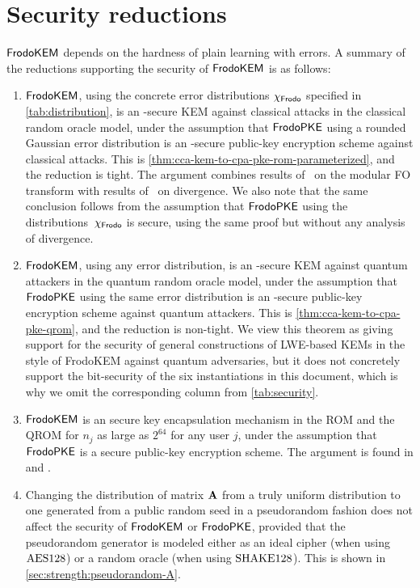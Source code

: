 \section{Security reductions}%
\label{sec:Security_appendix}

$\textsf{\upshape\mdseries FrodoKEM}$ depends on the hardness of plain learning with errors. A summary of the reductions supporting the security of $\textsf{\upshape\mdseries FrodoKEM}$ is
as follows:

\begin{enumerate}
\item $\textsf{\upshape\mdseries FrodoKEM}$, using the concrete error distributions
  $\chi_\textsf{\upshape\mdseries Frodo}$ specified in \autoref{tab:distribution}, is an
  \INDCCA-secure KEM against classical attacks in the classical random
  oracle model, under the assumption that $\textsf{\upshape\mdseries FrodoPKE}$ using a rounded
  Gaussian error distribution is an \INDCPA-secure public-key
  encryption scheme against classical attacks.  This is
  \autoref{thm:cca-kem-to-cpa-pke-rom-parameterized}, and the
  reduction is tight.  The argument combines results
  of~\cite{TCC:HofHovKil17} on the modular FO transform with results
  of~\cite{EC:LanSteSte14} on \renyi divergence. We also note that the
  same conclusion follows from the assumption that $\textsf{\upshape\mdseries FrodoPKE}$ using
  the distributions~$\chi_{\textsf{\upshape\mdseries Frodo}}$ is \INDCPA secure, using the same
  proof but without any analysis of \renyi divergence. 

\item $\textsf{\upshape\mdseries FrodoKEM}$, using any error distribution, is an \INDCCA-secure
  KEM against quantum attackers in the quantum random oracle model,
  under the assumption that $\textsf{\upshape\mdseries FrodoPKE}$ using the same error
  distribution is an \OWCPA-secure public-key encryption scheme
  against quantum attackers.  This is
  \autoref{thm:cca-kem-to-cpa-pke-qrom}, and the reduction is
  non-tight.  We view this theorem as giving support for the security
  of general constructions of LWE-based KEMs in the style of FrodoKEM
  against quantum adversaries, but it does not concretely support the
  bit-security of the six \FrodoKEM instantiations in this document,
  which is why we omit the corresponding column from
  \autoref{tab:security}.
\item $\textsf{\upshape\mdseries FrodoKEM}$ is an \MINDCCA secure key encapsulation mechanism in the ROM and the QROM for $n_j$ as large as $2^{64}$ for any user $j$, under the assumption that $\textsf{\upshape\mdseries FrodoPKE}$ is a \MINDCPA secure public-key encryption scheme. The argument is found in \cite{GlabushThesis} and \cite{Multi-challenge}.
\item Changing the distribution of matrix $\mathbf{A}$ from a truly uniform
  distribution to one generated from a public random seed in a
  pseudorandom fashion does not affect the security of $\textsf{\upshape\mdseries FrodoKEM}$ or
  $\textsf{\upshape\mdseries FrodoPKE}$, provided that the pseudorandom generator is modeled
  either as an ideal cipher (when using $\textrm{\upshape\mdseries AES128}$) or a random
  oracle (when using $\textrm{\upshape\mdseries SHAKE}128$). This is shown in
  \autoref{sec:strength:pseudorandom-A}.


\end{enumerate}
